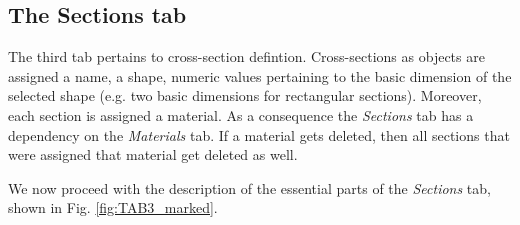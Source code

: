 \begin{appendices}
\section*{The Sections tab}

The third tab pertains to cross-section defintion. Cross-sections as objects 
are assigned a name, a shape, numeric values pertaining to the basic dimension 
of the selected shape (e.g. two basic dimensions for rectangular sections). 
Moreover, each section is assigned a material. As a consequence the 
\textit{Sections} tab has a dependency on the \textit{Materials} tab. If a  
material gets deleted, then all sections that were assigned that material get 
deleted as well. 

We now proceed with the description of the essential parts of the 
\textit{Sections} tab, shown in Fig. \ref{fig:TAB3_marked}.


\end{appendices}
